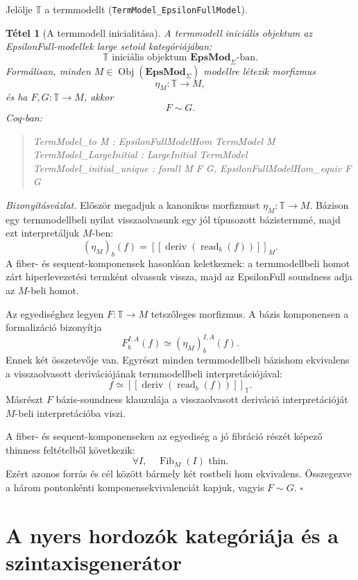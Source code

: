 \documentclass[11pt]{article}
\newtheorem{theorem}{Tétel}
\newenvironment{proofsketch}
  {\par\noindent\textit{Bizonyításvázlat.}}
  {\hfill$\square$\par}
\newenvironment{coqblock}
  {\begin{quote}\small\ttfamily\obeylines}
  {\end{quote}}
\newcommand{\EpsMod}{\mathbf{EpsMod}_{\Sigma}}
\newcommand{\TM}{\mathbb{T}}
\newcommand{\Obj}{\operatorname{Obj}}
\newcommand{\Fib}{\operatorname{Fib}}
\newcommand{\sem}[1]{[\![#1]\!]}
\begin{document}
Jelölje $\TM$ a termmodellt
(\texttt{TermModel\_EpsilonFullModel}).

\begin{theorem}[A termmodell inicialitása]
A termmodell iniciális objektum az EpsilonFull-modellek large setoid
kategóriájában:
\[
  \TM \text{ iniciális objektum } \EpsMod\text{-ban}.
\]
Formálisan, minden $M\in\Obj(\EpsMod)$ modellre létezik morfizmus
\[
  \eta_M:\TM\longrightarrow M,
\]
és ha $F,G:\TM\to M$, akkor
\[
  F\sim G.
\]
Coq-ban:
\begin{coqblock}
TermModel\_to M : EpsilonFullModelHom TermModel M
TermModel\_LargeInitial : LargeInitial TermModel
TermModel\_initial\_unique :
  forall M F G, EpsilonFullModelHom\_equiv F G
\end{coqblock}
\end{theorem}

\begin{proofsketch}
Először megadjuk a kanonikus morfizmust $\eta_M:\TM\to M$.
Bázison egy termmodellbeli nyilat visszaolvasunk egy jól típusozott
bázistermmé, majd ezt interpretáljuk $M$-ben:
\[
  (\eta_M)_b(f)
  =
  \sem{\operatorname{deriv}(\operatorname{read}_b(f))}_M.
\]
A fiber- és sequent-komponensek hasonlóan keletkeznek: a termmodellbeli
homot zárt hiperlevezetési termként olvassuk vissza, majd az EpsilonFull
soundness adja az $M$-beli homot.

Az egyediséghez legyen $F:\TM\to M$ tetszőleges morfizmus. A bázis
komponensen a formalizáció bizonyítja
\[
  F_b^{I,A}(f)\simeq (\eta_M)_b^{I,A}(f).
\]
Ennek két összetevője van. Egyrészt minden termmodellbeli bázishom
ekvivalens a visszaolvasott derivációjának termmodellbeli
interpretációjával:
\[
  f\simeq \sem{\operatorname{deriv}(\operatorname{read}_b(f))}_{\TM}.
\]
Másrészt $F$ bázis-soundness klauzulája a visszaolvasott deriváció
interpretációját $M$-beli interpretációba viszi.

A fiber- és sequent-komponenseken az egyediség a jó fibráció részét képező
thinness feltételből következik:
\[
  \forall I,\quad \Fib_M(I)\text{ thin}.
\]
Ezért azonos forrás és cél között bármely két rostbeli hom ekvivalens.
Összegezve a három pontonkénti komponensekvivalenciát kapjuk, vagyis
$F\sim G$.
\end{proofsketch}

\section{A nyers hordozók kategóriája és a szintaxisgenerátor}
\end{document}
